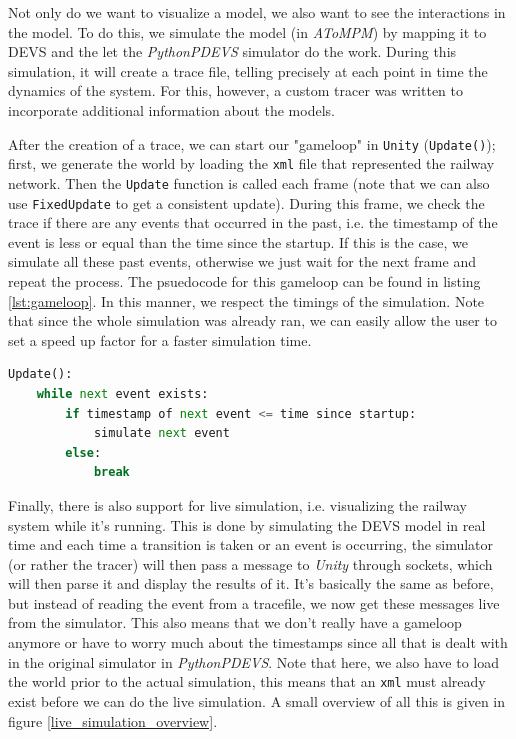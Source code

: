 \documentclass{article}
\begin{document}
Not only do we want to visualize a model, we also want to see the interactions in the model. To do this, we simulate the model (in \textit{AToMPM}) by mapping it to DEVS and the let the \textit{PythonPDEVS} simulator do the work. During this simulation, it will create a trace file, telling precisely at each point in time the dynamics of the system. For this, however, a custom tracer was written to incorporate additional information about the models.

After the creation of a trace, we can start our "gameloop" in \texttt{Unity} (\texttt{Update()}); first, we generate the world by loading the \texttt{xml} file that represented the railway network. Then the \texttt{Update} function is called each frame (note that we can also use \texttt{FixedUpdate} to get a consistent update). During this frame, we check the trace if there are any events that occurred in the past, i.e. the timestamp of the event is less or equal than the time since the startup. If this is the case, we simulate all these past events, otherwise we just wait for the next frame and repeat the process. The psuedocode for this gameloop can be found in listing \ref{lst:gameloop}. In this manner, we respect the timings of the simulation. Note that since the whole simulation was already ran, we can easily allow the user to set a speed up factor for a faster simulation time.

\begin{lstlisting}[language=python, caption=Pseudocode Gameloop, label={lst:gameloop}]
Update():
    while next event exists:
        if timestamp of next event <= time since startup:
            simulate next event
        else:
            break
\end{lstlisting}

Finally, there is also support for live simulation, i.e. visualizing the railway system while it's running. This is done by simulating the DEVS model in real time and each time a transition is taken or an event is occurring, the simulator (or rather the tracer) will then pass a message to \textit{Unity} through sockets, which will then parse it and display the results of it. It's basically the same as before, but instead of reading the event from a tracefile, we now get these messages live from the simulator. This also means that we don't really have a gameloop anymore or have to worry much about the timestamps since all that is dealt with in the original simulator in \textit{PythonPDEVS}. Note that here, we also have to load the world prior to the actual simulation, this means that an \texttt{xml} must already exist before we can do the live simulation. A small overview of all this is given in figure \ref{live_simulation_overview}.
\end{document}
